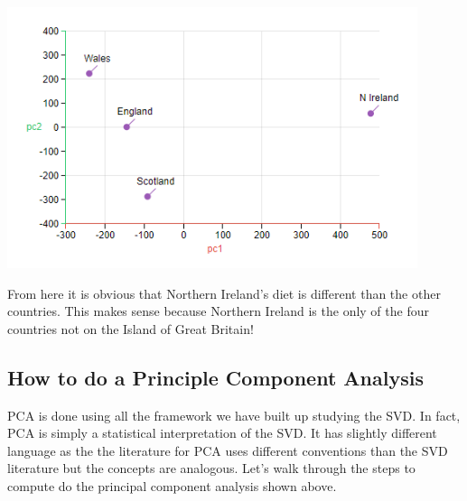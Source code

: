 \documentclass{article}
\begin{document}
\begin{center}
\includegraphics[width=12cm]{(18).png}
\end{center}

From here it is obvious that Northern Ireland's diet is different than the other countries. This makes sense because Northern Ireland is the only of the four countries not on the Island of Great Britain!

\subsection{How to do a Principle Component Analysis}
PCA is done using all the framework we have built up studying the SVD. In fact, PCA is simply a statistical interpretation of the SVD. It has slightly different language as the the literature for PCA uses different conventions than the SVD literature but the concepts are analogous. Let's walk through the steps to compute do the principal component analysis shown above.
\bigskip
\end{document}
